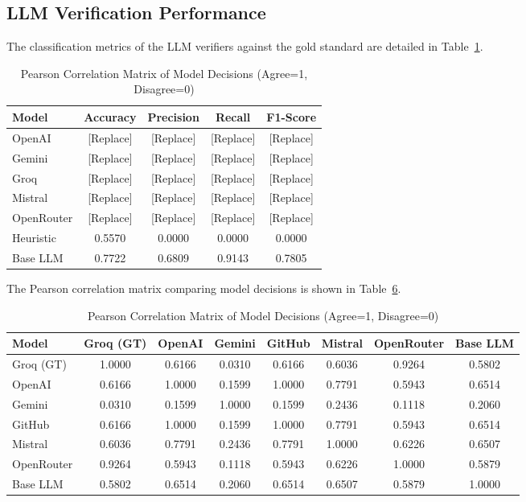 \documentclass[journal,compsoc]{IEEEtran}
\begin{document}
\begin{itemize}
\begin{table}[t]
\begin{itemize}
\begin{table}[t]
\subsection{LLM Verification Performance}
The classification metrics of the LLM verifiers against the gold standard are detailed in Table~\ref{tab:eval_metrics}.

\begin{table}[h]
\centering
\caption{LLM Verification Performance Comparison}
\label{tab:eval_metrics}
\begin{tabular}{lcccc}
\toprule
\textbf{Model} & \textbf{Accuracy} & \textbf{Precision} & \textbf{Recall} & \textbf{F1-Score} \\
\midrule
OpenAI & [Replace] & [Replace] & [Replace] & [Replace] \\
Gemini & [Replace] & [Replace] & [Replace] & [Replace] \\
Groq & [Replace] & [Replace] & [Replace] & [Replace] \\
Mistral & [Replace] & [Replace] & [Replace] & [Replace] \\
OpenRouter & [Replace] & [Replace] & [Replace] & [Replace] \\
Heuristic & 0.5570 & 0.0000 & 0.0000 & 0.0000 \\
Base LLM & 0.7722 & 0.6809 & 0.9143 & 0.7805 \\
\bottomrule
\end{tabular}
\end{table}

The Pearson correlation matrix comparing model decisions is shown in Table~\ref{tab:pearson}.

\begin{table}[t]
\centering
\caption{Pearson Correlation Matrix of Model Decisions (Agree=1, Disagree=0)}
\label{tab:pearson}
\begin{tabular}{lccccccc}
\toprule
\textbf{Model} & \textbf{Groq (GT)} & \textbf{OpenAI} & \textbf{Gemini} & \textbf{GitHub} & \textbf{Mistral} & \textbf{OpenRouter} & \textbf{Base LLM} \\
\midrule
Groq (GT) & 1.0000 & 0.6166 & 0.0310 & 0.6166 & 0.6036 & 0.9264 & 0.5802 \\
OpenAI & 0.6166 & 1.0000 & 0.1599 & 1.0000 & 0.7791 & 0.5943 & 0.6514 \\
Gemini & 0.0310 & 0.1599 & 1.0000 & 0.1599 & 0.2436 & 0.1118 & 0.2060 \\
GitHub & 0.6166 & 1.0000 & 0.1599 & 1.0000 & 0.7791 & 0.5943 & 0.6514 \\
Mistral & 0.6036 & 0.7791 & 0.2436 & 0.7791 & 1.0000 & 0.6226 & 0.6507 \\
OpenRouter & 0.9264 & 0.5943 & 0.1118 & 0.5943 & 0.6226 & 1.0000 & 0.5879 \\
Base LLM & 0.5802 & 0.6514 & 0.2060 & 0.6514 & 0.6507 & 0.5879 & 1.0000 \\
\bottomrule
\end{tabular}
\end{table}


\end{table}
\end{itemize}
\end{table}
\end{itemize}
\end{document}
